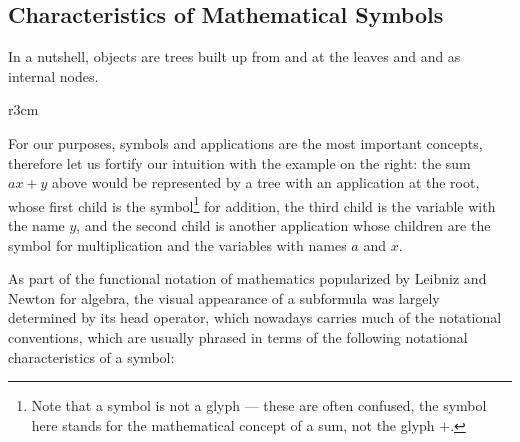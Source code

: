 \subsection{Characteristics of Mathematical Symbols}\label{sec:characteristics}

In a nutshell, {\openmath} objects are trees built up from {} and
{} at the leaves and {} and {} as internal
nodes. 

\begin{wrapfigure}{r}{3cm}\vspace*{-.5em}
\vspace*{-.5em}
\end{wrapfigure}
For our purposes, symbols and applications are the most important concepts,
therefore let us fortify our intuition with the example on the right: the sum $ax+y$ above
would be represented by a tree with an application at the root, whose first child is the
symbol\footnote{Note that a symbol is not a glyph --- these are often confused, the symbol
  here stands for the mathematical concept of a sum, not the glyph $+$.} for addition, the
third child is the variable with the name $y$, and the second child is another application
whose children are the symbol for multiplication and the variables with names $a$ and $x$.

As part of the functional notation of mathematics popularized by Leibniz and Newton for
algebra, the visual appearance of a subformula was largely determined by its head
operator, which nowadays carries much of the notational conventions, which are usually
phrased in terms of the following notational characteristics of a symbol:


